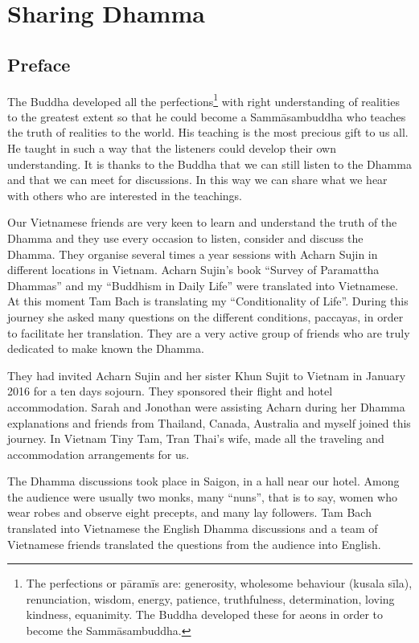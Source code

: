 \part{Sharing Dhamma}

\chapter{Preface}

The Buddha developed all the
perfections\footnote{The perfections or pāramīs are: generosity, wholesome behaviour (kusala sīla),
renunciation, wisdom, energy, patience, truthfulness, determination,
loving kindness, equanimity. The Buddha developed these for aeons in
order to become the Sammāsambuddha.}  with right
understanding of realities to the greatest extent so that he could
become a Sammāsam\-buddha who teaches the truth of realities to the world.
His teaching is the most precious gift to us all. He taught in such a
way that the listeners could develop their own understanding. It is
thanks to the Buddha that we can still listen to the Dhamma and that we
can meet for discussions. In this way we can share what we hear with
others who are interested in the teachings.

Our Vietnamese friends are very keen to learn and understand the truth
of the Dhamma and they use every occasion to listen, consider and
discuss the Dhamma. They organise several times a year sessions with
Acharn Sujin in different locations in Vietnam. Acharn Sujin's book
``Survey of Paramattha Dhammas'' and my ``Buddhism in Daily Life'' were
translated into Vietnamese. At this moment Tam Bach is translating my
``Conditionality of Life''. During this journey she asked many questions
on the different conditions, paccayas, in order to facilitate her
translation. They are a very active group of friends who are truly
dedicated to make known the Dhamma.

They had invited Acharn Sujin and her sister Khun Sujit to Vietnam in
January 2016 for a ten days sojourn. They sponsored their flight and
hotel accommodation. Sarah and Jonothan were assisting Acharn during her
Dhamma explanations and friends from Thailand, Canada, Australia and
myself joined this journey. In Vietnam Tiny Tam, Tran Thai's wife, made
all the traveling and accommodation arrangements for us.

The Dhamma discussions took place in Saigon, in a hall near our hotel.
Among the audience were usually two monks, many ``nuns'', that is to
say, women who wear robes and observe eight precepts, and many lay
followers. Tam Bach translated into Vietnamese the English Dhamma
discussions and a team of Vietnamese friends translated the questions
from the audience into English.

